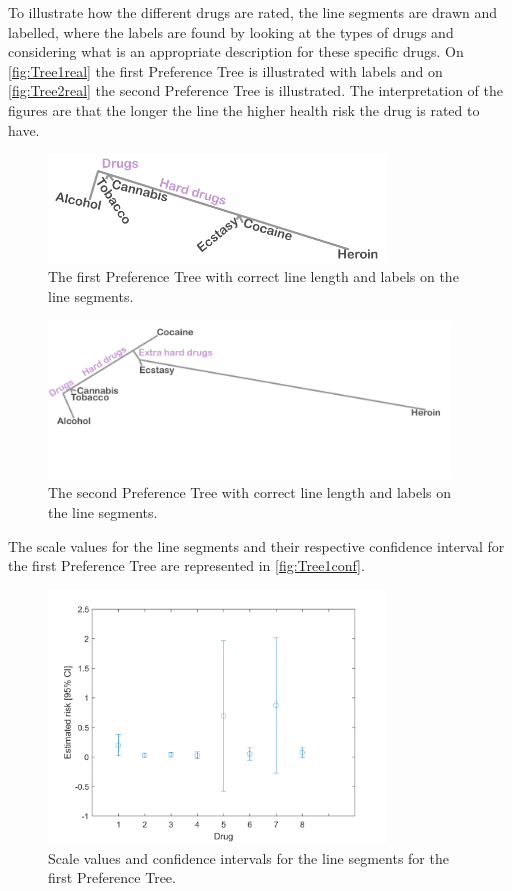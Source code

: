 \noindent 
%
To illustrate how the different drugs are rated, the line segments are drawn and labelled, where the labels are found by looking at the types of drugs and considering what is an appropriate description for these specific drugs. On \autoref{fig:Tree1real} the first Preference Tree is illustrated with labels and on \autoref{fig:Tree2real} the second Preference Tree is illustrated. The interpretation of the figures are that the longer the line the higher health risk the drug is rated to have.  
%
\begin{figure}[H]
\centering
\includegraphics[width = 0.80\textwidth]{Figure/Tree1real}
\caption{The first Preference Tree with correct line length and labels on the line segments.}
\label{fig:Tree1real}
\end{figure}
\noindent
%
\begin{figure}[H]
	\centering
	\includegraphics[width = 0.95\textwidth]{Figure/Tree2real}
	\caption{The second Preference Tree with correct line length and labels on the line segments.}
	\label{fig:Tree2real}
\end{figure}
\newpage
\noindent
%
The scale values for the line segments and their respective confidence interval for the first Preference Tree are represented in \autoref{fig:Tree1conf}.
%
\begin{figure}[H]
	\centering
	\includegraphics[width = 0.80\textwidth]{Figure/confidense_p1220}
	\caption{Scale values and confidence intervals for the line segments for the first Preference Tree.}
	\label{fig:Tree1conf}
\end{figure}
